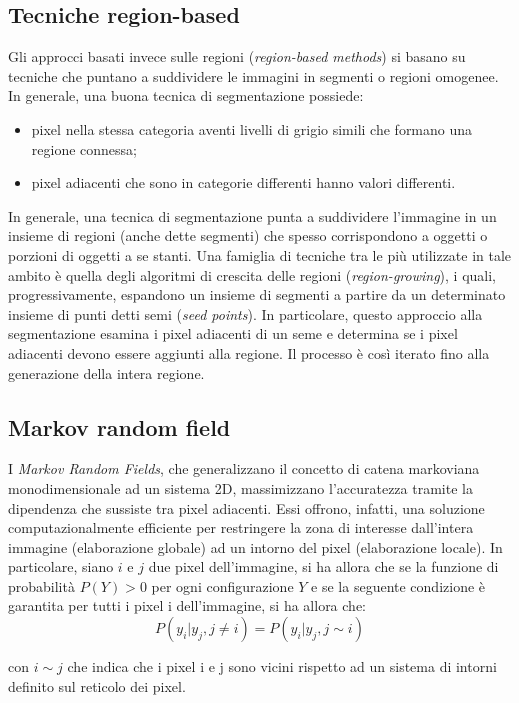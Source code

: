 \subsection*{Tecniche region-based}
Gli approcci basati invece sulle regioni (\emph{region-based methods}) si basano su tecniche che puntano a suddividere le immagini in segmenti o regioni omogenee. In generale, una buona tecnica di segmentazione possiede:
\begin{itemize}
\item pixel nella stessa categoria aventi livelli di grigio simili che formano una regione connessa;
\item pixel adiacenti che sono in categorie differenti hanno valori differenti. 
\end{itemize}
In generale, una tecnica di segmentazione punta a suddividere l'immagine in un insieme di regioni (anche dette segmenti) che spesso corrispondono a oggetti o porzioni di oggetti a se stanti. 
Una famiglia di tecniche tra le più utilizzate in tale ambito è quella degli algoritmi di crescita delle regioni (\emph{region-growing}), i quali, progressivamente, espandono un insieme di segmenti a partire da un determinato insieme di punti detti semi (\emph{seed points}).
In particolare, questo approccio alla segmentazione esamina i pixel adiacenti di un seme e determina se i pixel adiacenti devono essere aggiunti alla regione. Il processo è così iterato fino alla generazione della intera regione. 


\subsection*{Markov random field}
I \emph{Markov Random Fields}, che generalizzano il concetto di catena markoviana monodimensionale ad un sistema 2D, massimizzano l'accuratezza tramite la dipendenza che sussiste tra pixel adiacenti. 
Essi offrono, infatti, una soluzione computazionalmente efficiente per restringere la zona di interesse dall'intera immagine (elaborazione globale) ad un intorno del pixel (elaborazione locale). 
In particolare, siano $i$ e $j$ due pixel dell'immagine, si ha allora che se la funzione di probabilità $P(Y)>0$ per ogni configurazione $Y$ e se la seguente condizione è garantita per tutti i pixel i dell'immagine, si ha allora che:
\begin{equation}
P(y_i|y_j, j \neq i) = P(y_i|y_j, j\sim i)
\end{equation}   

con $i\sim j$ che indica che i pixel i e j sono vicini rispetto ad un sistema di intorni definito sul reticolo dei pixel.\\

